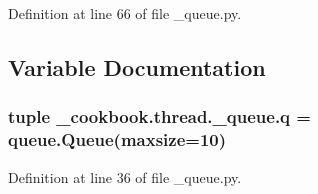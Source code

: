 Definition at line 66 of file \-\_\-queue.\-py.



\subsection{Variable Documentation}
\hypertarget{namespace__cookbook_1_1thread_1_1__queue_ab96e0faed9a5bf9793248aaad5d463ee}{
\subsubsection[{q}]{\setlength{\rightskip}{0pt plus 5cm}tuple \-\_\-cookbook.\-thread.\-\_\-queue.\-q = queue.\-Queue(maxsize=10)}}\label{namespace__cookbook_1_1thread_1_1__queue_ab96e0faed9a5bf9793248aaad5d463ee}


Definition at line 36 of file \-\_\-queue.\-py.

